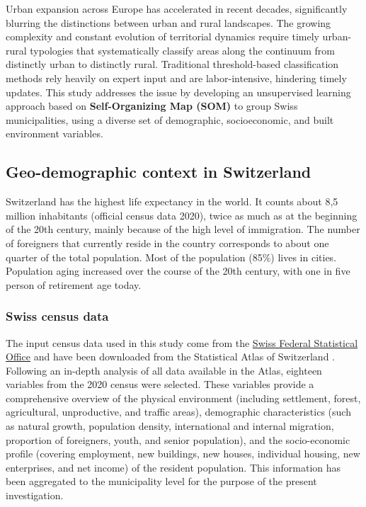 \documentclass[
]{article}
\begin{document}
Urban expansion across Europe has accelerated in recent decades, significantly blurring the distinctions between urban and rural landscapes.
The growing complexity and constant evolution of territorial dynamics require timely urban-rural typologies that systematically classify areas along the continuum from distinctly urban to distinctly rural.
Traditional threshold-based classification methods rely heavily on expert input and are labor-intensive, hindering timely updates.
This study addresses the issue by developing an unsupervised learning approach based on \textbf{Self-Organizing Map (SOM)} \citep{kohonen_self-organized_1982} to group Swiss municipalities, using a diverse set of demographic, socioeconomic, and built environment variables.

\subsection{Geo-demographic context in Switzerland}\label{geo-demographic-context-in-switzerland}

Switzerland has the highest life expectancy in the world.
It counts about 8,5 million inhabitants (official census data 2020), twice as much as at the beginning of the 20th century, mainly because of the high level of immigration.
The number of foreigners that currently reside in the country corresponds to about one quarter of the total population.
Most of the population (85\%) lives in cities.
Population aging increased over the course of the 20th century, with one in five person of retirement age today.

\subsubsection{Swiss census data}\label{swiss-census-data}

The input census data used in this study come from the \href{https://www.bfs.admin.ch/bfs/en/home.html}{Swiss Federal Statistical Office} and have been downloaded from the Statistical Atlas of Switzerland \citep{FSO_2024}.
Following an in-depth analysis of all data available in the Atlas, eighteen variables from the 2020 census were selected.
These variables provide a comprehensive overview of the physical environment (including settlement, forest, agricultural, unproductive, and traffic areas), demographic characteristics (such as natural growth, population density, international and internal migration, proportion of foreigners, youth, and senior population), and the socio-economic profile (covering employment, new buildings, new houses, individual housing, new enterprises, and net income) of the resident population.
This information has been aggregated to the municipality level for the purpose of the present investigation.
\end{document}
